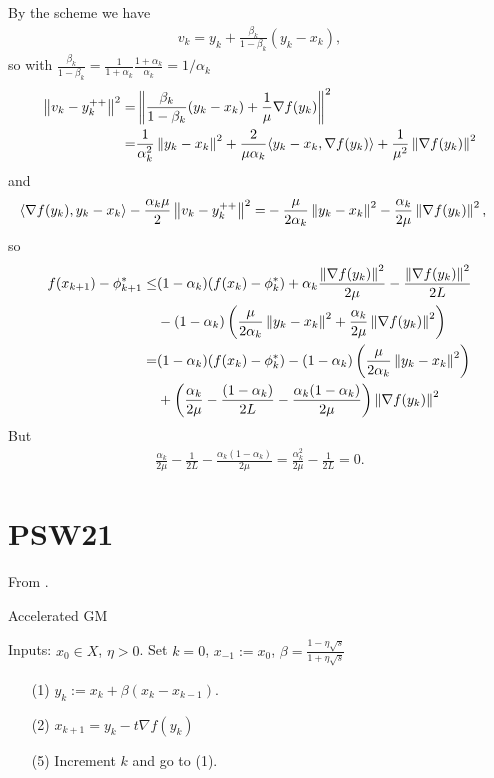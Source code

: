 \documentclass[12pt,english]{article}
\begin{document}
By the scheme we have
%
\begin{align*}
v_k = y_k + \frac{\beta_k}{1-\beta_k}(y_k - x_k),
\end{align*}
%
so with $\frac{\beta_k}{1-\beta_k}= \frac{1}{1+\alpha_k}\frac{1+\alpha_k}{\alpha_k}=1/\alpha_k$
%
\begin{align*}
\left\|v_{k}-y_k^{++}\right\|^2 =& \left\|\frac{\beta_k}{1-\beta_k}(y_k - x_k) + \frac{1}{\mu}\nabla f(y_k)\right\|^2\\
= &\frac{1}{\alpha_k^2}\left\|y_k - x_k\right\|^2 +  \frac{2}{\mu\alpha_k}\langle y_k - x_k,\nabla f(y_k)\rangle
+\frac{1}{\mu^2}\left\|\nabla f(y_k)\right\|^2
\end{align*}
%
and 
%
\begin{align*}
\langle\nabla f(y_k),y_k - x_k\rangle -  \frac{\alpha_k\mu}{2}\left\|v_k-y_k^{++}\right\|^2 =& -\frac{\mu}{2\alpha_k}\left\|y_k - x_k\right\|^2 -\frac{\alpha_k}{2\mu}\left\|\nabla f(y_k)\right\|^2,
\end{align*}
%
so
%
\begin{align*}
f(x_{k+1})-\phi^*_{k+1}\le& (1-\alpha_k)(f(x_k)-\phi_{k}^*)+ \alpha_k\frac{\left\|\nabla f(y_k)\right\|^2}{2\mu}-\frac{\left\|\nabla f(y_k)\right\|^2}{2L}\\
&- (1-\alpha_k)\left(\frac{\mu}{2\alpha_k}\left\|y_k - x_k\right\|^2 +\frac{\alpha_k}{2\mu}\left\|\nabla f(y_k)\right\|^2\right)\\
=& (1-\alpha_k)(f(x_k)-\phi_{k}^*) - (1-\alpha_k)\left(\frac{\mu}{2\alpha_k}\left\|y_k - x_k\right\|^2\right)\\
&+ \left(\frac{\alpha_k}{2\mu}-\frac{(1-\alpha_k)}{2L}- \frac{\alpha_k(1-\alpha_k)}{2\mu}\right)\left\|\nabla f(y_k)\right\|^2
\end{align*}
%
But
%
\begin{align*}
\frac{\alpha_k}{2\mu}-\frac{1}{2L}- \frac{\alpha_k(1-\alpha_k)}{2\mu} = \frac{\alpha_k^2}{2\mu}-\frac{1}{2L}=0.
\end{align*}
%


%
\section{PSW21}\label{sec:}
%
From \cite{ParkSalgadoWise21}.

%
\begin{yellow}
\begin{algorithm}[H]
\caption{Accelerated GM} 
\label{algorithm:PSW21AGM} 
%
Inputs: $x_0\in X$, $\eta>0$. Set $k=0$, $x_{-1}:=x_0$, $\beta= \frac{1-\eta\sqrt{s}}{1+\eta\sqrt{s}}$
%
\begin{itemize}
\item[(1)] $y_{k} :=  x_k + \beta(x_k-x_{k-1})$.
\item[(2)] $x_{k+1} = y_k - t\nabla f(y_k)$
\item[(5)] Increment $k$ and go to (1).
\end{itemize}
%
\end{algorithm}
\end{yellow}
\end{document}
